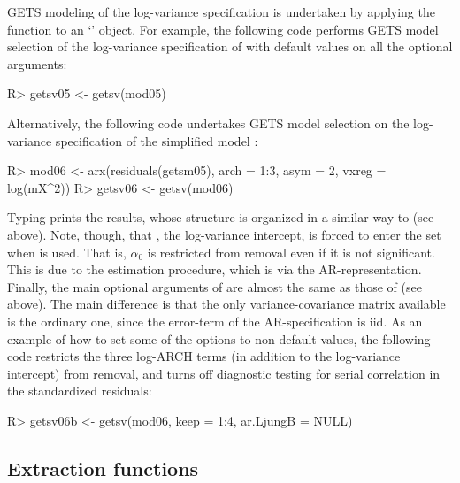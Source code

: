 \documentclass[article,nojss]{jss}
\begin{document}
GETS modeling of the log-variance specification is undertaken by
applying the  function to an `' object. For
example, the following code performs GETS model selection of the
log-variance specification of  with default values on all
the optional arguments:
%
\begin{CodeChunk}
\begin{CodeInput}
R> getsv05 <- getsv(mod05)
\end{CodeInput}
\end{CodeChunk}
%
Alternatively, the following code undertakes GETS model selection on the log-variance specification of the simplified model :
%
\begin{CodeChunk}
\begin{CodeInput}
R> mod06 <- arx(residuals(getsm05), arch = 1:3, asym = 2, vxreg = log(mX^2))
R> getsv06 <- getsv(mod06)
\end{CodeInput}
\end{CodeChunk}
%
Typing  prints the results, whose structure is organized
in a similar way to  (see above). Note, though, that
, the log-variance intercept, is forced to enter the
 set when  is used. That is, $\alpha_0$ is
restricted from removal even if it is not significant. This is due to
the estimation procedure, which is via the AR-representation. Finally,
the main optional arguments of  are almost the same as
those of  (see above). The main difference is that the
only variance-covariance matrix available is the ordinary one, since
the error-term of the AR-specification is iid. As an example of how to
set some of the options to non-default values, the following code
restricts the three log-ARCH terms (in addition to the log-variance
intercept) from removal, and turns off diagnostic testing for serial
correlation in the standardized residuals:
%
\begin{CodeChunk}
\begin{CodeInput}
R> getsv06b <- getsv(mod06, keep = 1:4, ar.LjungB = NULL)
\end{CodeInput}
\end{CodeChunk}

\subsection{Extraction functions}
\label{subsec:gets:extraction:functions}
\end{document}
